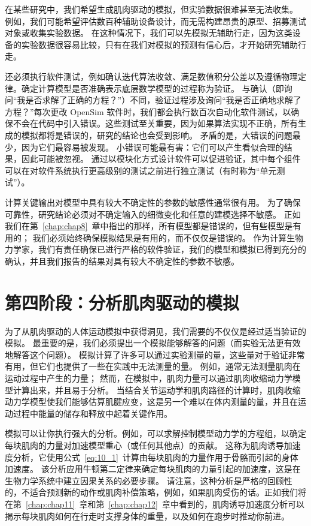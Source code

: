 在某些研究中，我们希望生成肌肉驱动的模拟，但实验数据很难甚至无法收集。
例如，我们可能希望评估数百种辅助设备设计，而无需构建昂贵的原型、招募测试对象或收集实验数据。
在这种情况下，我们可以先模拟无辅助行走，因为这类设备的实验数据很容易比较，只有在我们对模拟的预测有信心后，才开始研究辅助行走。


还必须执行软件测试，例如确认迭代算法收敛、满足数值积分公差以及遵循物理定律。确定计算模型是否准确表示底层数学模型的过程称为验证。
与确认（即询问“我是否求解了正确的方程？”）不同，验证过程涉及询问“我是否正确地求解了方程？”每次更改 OpenSim 软件时，我们都会执行数百次自动化软件测试，以确保不会在代码中引入错误。这些测试至关重要，因为如果算法实现不正确，所有生成的模拟都将是错误的，研究的结论也会受到影响。
矛盾的是，大错误的问题最少，因为它们最容易被发现。
小错误可能最有害：它们可以产生看似合理的结果，因此可能被忽视。
通过以模块化方式设计软件可以促进验证，其中每个组件可以在对软件系统执行更高级别的测试之前进行独立测试（有时称为“单元测试”）。


计算关键输出对模型中具有较大不确定性的参数的敏感性通常很有用。
为了确保可靠性，研究结论必须对不确定输入的细微变化和任意的建模选择不敏感。
正如我们在第~\ref{chap:chap8}~章中指出的那样，所有模型都是错误的，但有些模型是有用的；
我们必须始终确保模拟结果是有用的，而不仅仅是错误的。
作为计算生物力学家，我们有责任确保已进行严格的软件验证，我们的模型和模拟已得到充分的确认，并且我们报告的结果对具有较大不确定性的参数不敏感。


\section{第四阶段：分析肌肉驱动的模拟}

为了从肌肉驱动的人体运动模拟中获得洞见，我们需要的不仅仅是经过适当验证的模拟。
最重要的是，我们必须提出一个模拟能够解答的问题（而实验无法更有效地解答这个问题）。
模拟计算了许多可以通过实验测量的量，这些量对于验证非常有用，但它们也提供了一些在实践中无法测量的量。
例如，通常无法测量肌肉在运动过程中产生的力量；
然而，在模拟中，肌肉力量可以通过肌肉收缩动力学模型计算出来，并且易于分析。
当结合关节运动学和肌肉路径的计算时，肌肉收缩动力学模型使我们能够估算肌腱应变，这是另一个难以在体内测量的量，并且在运动过程中能量的储存和释放中起着关键作用。


模拟可以让你执行强大的分析。例如，可以求解控制模型动力学的方程组，以确定每块肌肉的力量对加速模型重心（或任何其他点）的贡献。
这称为肌肉诱导加速度分析，它使用公式~\ref{eq:10_1}~计算由每块肌肉的力量作用于骨骼而引起的身体加速度。
该分析应用牛顿第二定律来确定每块肌肉的力量引起的加速度，这是在生物力学系统中建立因果关系的必要步骤。
请注意，这种分析是严格的回顾性的，不适合预测新的动作或肌肉补偿策略，例如，如果肌肉受伤的话。正如我们将在第~\ref{chap:chap11}~章和第~\ref{chap:chap12}~章中看到的，肌肉诱导加速度分析可以揭示每块肌肉如何在行走时支撑身体的重量，以及如何在跑步时推动你前进。


